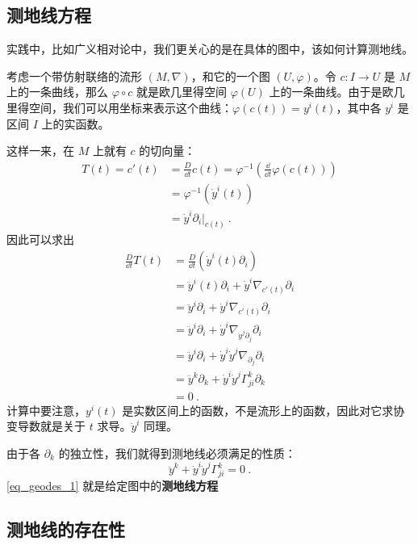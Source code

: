 \subsection{测地线方程}

实践中，比如广义相对论中，我们更关心的是在具体的图中，该如何计算测地线。

考虑一个带仿射联络的流形 $(M, \nabla)$，和它的一个图 $(U, \varphi)$。令 $c:I\to U$ 是 $M$ 上的一条曲线，那么 $\varphi\circ c$ 就是欧几里得空间 $\varphi(U)$ 上的一条曲线。由于是欧几里得空间，我们可以用坐标来表示这个曲线：$\varphi(c(t))=y^i(t)$，其中各 $y^i$ 是区间 $I$ 上的实函数。


这样一来，在 $M$ 上就有 $c$ 的切向量：
\begin{equation}
\begin{aligned}
T(t)=c'(t)&=\frac{D}{\dd t}c(t)=\varphi^{-1}(\frac{\dd}{\dd t}\varphi(c(t)))\\
&=\varphi^{-1}(\dot{y}^i(t))\\
&=\dot{y}^i\partial_i|_{c(t)}~.
\end{aligned}
\end{equation}
因此可以求出
\begin{equation}
\begin{aligned}
\frac{D}{\dd t}T(t)&=\frac{D}{\dd t}(\dot{y}^i(t)\partial_i)\\
&=\ddot{y}^i(t)\partial_i+\dot{y}^i\nabla_{c'(t)}\partial_i\\
&=\ddot{y}^i\partial_i+\dot{y}^i\nabla_{c'(t)}\partial_i\\
&=\ddot{y}^i\partial_i+\dot{y}^i\nabla_{\dot{y}^j\partial_j}\partial_i\\
&=\ddot{y}^i\partial_i+\dot{y}^i\dot{y}^j\nabla_{\partial_j}\partial_i\\
&=\ddot{y}^k\partial_k+\dot{y}^i\dot{y}^j\Gamma^k_{ji}\partial_k\\
&=0~.
\end{aligned}
\end{equation}
计算中要注意，$y^i(t)$ 是实数区间上的函数，不是流形上的函数，因此对它求协变导数就是关于 $t$ 求导。$\dot{y}^i$ 同理。

由于各 $\partial_k$ 的独立性，我们就得到测地线必须满足的性质：
\begin{equation}\label{eq_geodes_1}
\ddot{y}^k+\dot{y}^i\dot{y}^j\Gamma^k_{ji}=0~.
\end{equation}
\autoref{eq_geodes_1} 就是给定图中的\textbf{测地线方程}


\subsection{测地线的存在性}

